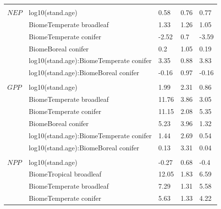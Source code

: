 \documentclass[
]{article}
\begin{document}
\begin{longtable}{lllll}
\endfoot
\bottomrule
\endlastfoot
\addlinespace[1em]
\multicolumn{4}{l}{\textbf{}}\\
\hspace{1em}$NEP$ & log10(stand.age) & 0.58 & 0.76 & 0.77\\
\hspace{1em} & BiomeTemperate broadleaf & 1.33 & 1.26 & 1.05\\
\hspace{1em} & BiomeTemperate conifer & -2.52 & 0.7 & -3.59\\
\hspace{1em} & BiomeBoreal conifer & 0.2 & 1.05 & 0.19\\
\hspace{1em} & log10(stand.age):BiomeTemperate conifer & 3.35 & 0.88 & 3.83\\
\hspace{1em} & log10(stand.age):BiomeBoreal conifer & -0.16 & 0.97 & -0.16\\
\addlinespace[1em]
\multicolumn{4}{l}{\textbf{}}\\
\hspace{1em}$GPP$ & log10(stand.age) & 1.99 & 2.31 & 0.86\\
\hspace{1em} & BiomeTemperate broadleaf & 11.76 & 3.86 & 3.05\\
\hspace{1em} & BiomeTemperate conifer & 11.15 & 2.08 & 5.35\\
\hspace{1em} & BiomeBoreal conifer & 5.23 & 3.96 & 1.32\\
\hspace{1em} & log10(stand.age):BiomeTemperate conifer & 1.44 & 2.69 & 0.54\\
\hspace{1em} & log10(stand.age):BiomeBoreal conifer & 0.13 & 3.31 & 0.04\\
\addlinespace[1em]
\multicolumn{4}{l}{\textbf{}}\\
\hspace{1em}$NPP$ & log10(stand.age) & -0.27 & 0.68 & -0.4\\
\hspace{1em} & BiomeTropical broadleaf & 12.05 & 1.83 & 6.59\\
\hspace{1em} & BiomeTemperate broadleaf & 7.29 & 1.31 & 5.58\\
\hspace{1em} & BiomeTemperate conifer & 5.63 & 1.33 & 4.22\\

\end{longtable}
\end{document}
